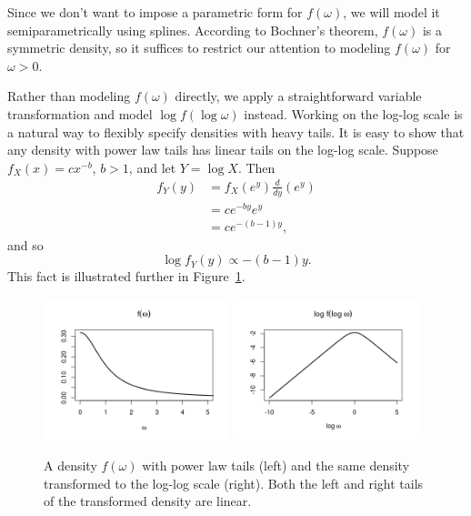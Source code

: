 \documentclass[12pt]{article}
\begin{document}
Since we don't want to impose a parametric form for $f(\omega)$, we will model it semiparametrically using splines. According to Bochner's theorem, $f(\omega)$ is a symmetric density, so it suffices to restrict our attention to modeling $f(\omega)$ for $\omega > 0$.

Rather than modeling $f(\omega)$ directly, we apply a straightforward variable transformation and model $\log f(\log \omega)$ instead. Working on the log-log scale is a natural way to flexibly specify densities with heavy tails.  It is easy to show that any density with power law tails has linear tails on the log-log scale. Suppose $f_X(x) = cx^{-b}$, $b > 1$, and let $Y = \log X$. Then
\begin{align*}
  f_Y(y) &= f_X(e^y) \frac{d}{dy}(e^y) \\
  &= ce^{-by}e^y \\
  &= ce^{-(b-1)y},
\end{align*}
and so
\[
  \log f_Y(y) \propto -(b-1)y.
\]
This fact is illustrated further in Figure~\ref{fig:logdens_ex}.

\begin{figure}[!htb]
  \centering
  \includegraphics[width=0.48\textwidth]{dens_ex.png}
  \includegraphics[width=0.48\textwidth]{logdens_ex.png}
  \caption{\small A density $f(\omega)$ with power law tails (left) and the same density transformed to the log-log scale (right). Both the left and right tails of the transformed density are linear.}
  \label{fig:logdens_ex}
\end{figure}
\end{document}
